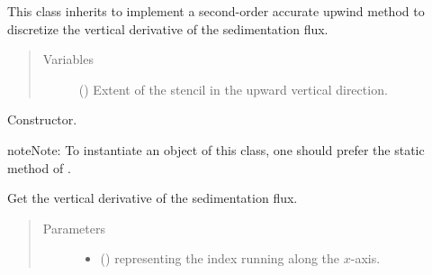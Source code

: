 \documentclass[letterpaper,10pt,english]{sphinxmanual}
\begin{document}
\begin{fulllineitems}
\label{\detokenize{api:dycore.flux_sedimentation.FluxSedimentationUpwindSecondOrder}}
This class inherits  to implement a second-order
accurate upwind method to discretize the vertical derivative of the sedimentation flux.
\begin{quote}\begin{description}
\item[{Variables}] \leavevmode
{\hyperref[\detokenize{api:dycore.prognostic_isentropic.PrognosticIsentropic.nb}]{}} () \textendash{} Extent of the stencil in the upward vertical direction.

\end{description}\end{quote}

\begin{fulllineitems}
\label{\detokenize{api:dycore.flux_sedimentation.FluxSedimentationUpwindSecondOrder.__init__}}
Constructor.

\begin{sphinxadmonition}{note}{Note:}
To instantiate an object of this class, one should prefer the static method
 of
.
\end{sphinxadmonition}

\end{fulllineitems}


\begin{fulllineitems}
\label{\detokenize{api:dycore.flux_sedimentation.FluxSedimentationUpwindSecondOrder.get_vertical_derivative_of_sedimentation_flux}}
Get the vertical derivative of the sedimentation flux.
\begin{quote}\begin{description}
\item[{Parameters}] \leavevmode\begin{itemize}
\item {} 
 () \textendash{}  representing the index running along the \(x\)-axis.


\end{itemize}
\end{description}
\end{quote}
\end{fulllineitems}
\end{fulllineitems}
\end{document}

